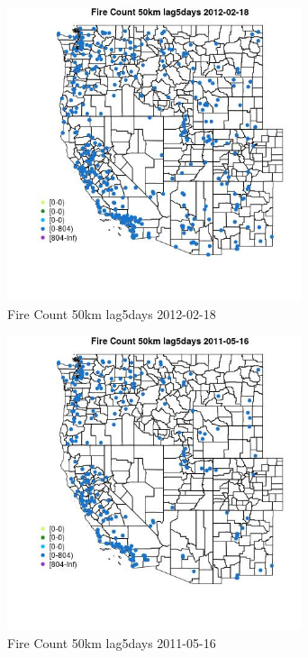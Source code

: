 \begin{figure} 
\centering  
\includegraphics[width=0.77\textwidth]{Code_Outputs/Report_ML_input_PM25_Step4_part_f_de_duplicated_aves_prioritize_24hr_obswNAs_MapObsFire_Count_50km_lag5days2012-02-18.jpg} 
\caption{\label{fig:Report_ML_input_PM25_Step4_part_f_de_duplicated_aves_prioritize_24hr_obswNAsMapObsFire_Count_50km_lag5days2012-02-18}Fire Count 50km lag5days 2012-02-18} 
\end{figure} 
 

\begin{figure} 
\centering  
\includegraphics[width=0.77\textwidth]{Code_Outputs/Report_ML_input_PM25_Step4_part_f_de_duplicated_aves_prioritize_24hr_obswNAs_MapObsFire_Count_50km_lag5days2011-05-16.jpg} 
\caption{\label{fig:Report_ML_input_PM25_Step4_part_f_de_duplicated_aves_prioritize_24hr_obswNAsMapObsFire_Count_50km_lag5days2011-05-16}Fire Count 50km lag5days 2011-05-16} 
\end{figure} 
 

